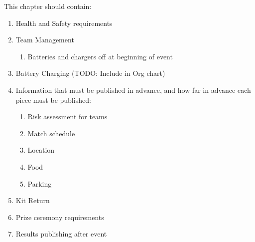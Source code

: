 This chapter should contain:
\begin{enumerate}

\item Health and Safety requirements

\item Team Management
  \begin{enumerate}
  \item Batteries and chargers off at beginning of event
  \end{enumerate}

\item Battery Charging (TODO: Include in Org chart)

\item Information that must be published in advance, and how far in advance each piece must be published:
  \begin{enumerate}
  \item Risk assessment for teams
  \item Match schedule
  \item Location
  \item Food
  \item Parking
  \end{enumerate}

\item Kit Return
\item Prize ceremony requirements
\item Results publishing after event
\end{enumerate}
